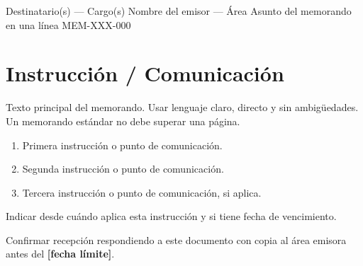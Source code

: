 \documentclass{../base/canon}
\begin{document}
\MemoBlock%
  {Destinatario(s) — Cargo(s)}%
  {Nombre del emisor — Área}%
  {Asunto del memorando en una línea}%
  {MEM-XXX-000}

\section{Instrucción / Comunicación}

Texto principal del memorando. Usar lenguaje claro, directo y sin ambigüedades.
Un memorando estándar no debe superar una página.

\begin{enumerate}
  \item Primera instrucción o punto de comunicación.
  \item Segunda instrucción o punto de comunicación.
  \item Tercera instrucción o punto de comunicación, si aplica.
\end{enumerate}

\begin{ObservationBox}[Vigencia]
  Indicar desde cuándo aplica esta instrucción y si tiene fecha de vencimiento.
\end{ObservationBox}

 Confirmar recepción respondiendo a este documento
con copia al área emisora antes del \textbf{[fecha límite]}.


\ContactSignature
\end{document}
